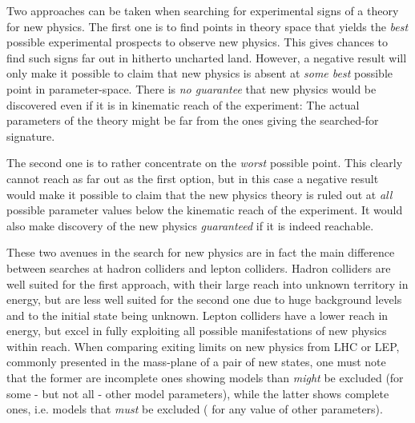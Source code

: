 \newcommand{\mstq}    {\mbox{$ M_{\widetilde {\mathrm t}}                      $}}
\newcommand{\sbq}     {\mbox{$ \widetilde {\mathrm b}                          $}}
\newcommand{\sbqone}  {\mbox{$ \widetilde {\mathrm b}_1                        $}}
\newcommand{\sbqtwo}  {\mbox{$ \widetilde {\mathrm b}_2                        $}}
\newcommand{\msbq}    {\mbox{$ M_{\widetilde {\mathrm b}}                      $}}
\newcommand{\msbqone}    {\mbox{$ M_{\widetilde {\mathrm b}_1}                 $}}
\newcommand{\msbqtwo}    {\mbox{$ M_{\widetilde {\mathrm b}_2}                 $}}
\newcommand{\mstqone}    {\mbox{$ M_{\widetilde {\mathrm t}_1}                 $}}
\newcommand{\mstqtwo}    {\mbox{$ M_{\widetilde {\mathrm t}_2}                 $}}
\newcommand{\eeto}    {\mbox{$ {\, \mathrm e}^+ {\mathrm e}^- \to             $}}
\newcommand{\Ecms}    {\mbox{$ E_{\mathrm{\small cms}}                      $}}
Two approaches can be taken when searching for experimental signs of
a theory for new physics.
The first one is to find points in theory space that yields the
{\it best} possible experimental prospects to observe new physics.
This gives chances to find such signs far out in
hitherto uncharted land.
However,
a negative result will only make it possible to claim that
new physics is absent at {\it some best} possible point
in parameter-space.
There is {\it no guarantee} that new physics would be discovered
even if it is in kinematic reach of the experiment:
The actual parameters of the theory might be far from the
ones giving the searched-for signature.

The second one is to rather concentrate on the {\it worst} possible
point.
This clearly cannot reach as far out as the first option,
but in this case a negative result
would make it possible to claim that the new physics theory is
ruled out at {\it all} possible parameter values below the
kinematic reach of the experiment.
It would also make discovery of the new physics {\it guaranteed}
if it is indeed reachable.

These two avenues in the search for new physics
are in fact the main difference between searches at
hadron colliders and lepton colliders.
Hadron colliders are well suited for the first approach,
with their large reach into unknown territory in
energy,
but are less well suited for the second one due to
huge background levels and to the initial state
being unknown.
Lepton colliders have a lower
reach in energy,
but excel in fully exploiting
all possible manifestations of new physics within
reach. 
When comparing exiting limits  on new physics from LHC or LEP,
commonly presented in the mass-plane
of a pair of new states,
one must note that the former are incomplete ones
showing
models than {\it might} be excluded (for some - but not all -
  other model parameters),
while the latter shows complete ones,
i.e. models that
{\it must} be excluded ( for any value of other parameters).

